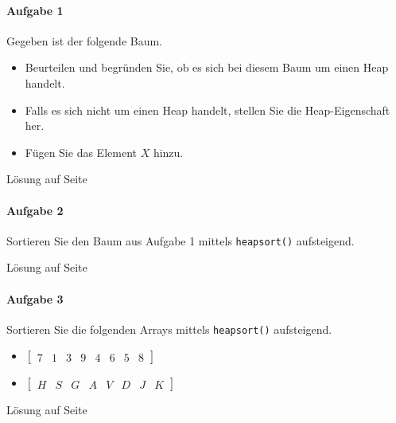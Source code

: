 \documentclass[11pt,a4paper]{scrartcl}
\begin{document}
\paragraph{Aufgabe 1} Gegeben ist der folgende Baum.
\begin{itemize}
\item Beurteilen und begründen Sie, ob es sich bei diesem Baum um einen Heap handelt.
\item Falls es sich nicht um einen Heap handelt, stellen Sie die Heap-Eigenschaft her.
\item Fügen Sie das Element $X$ hinzu.
\end{itemize}
\begin{figure}[h]
\centering
{}
\end{figure}
\begin{flushright}
Lösung auf Seite \pageref{a5.1:lsg} \\
\end{flushright}
\paragraph{Aufgabe 2} 
Sortieren Sie den Baum aus Aufgabe 1 mittels \texttt{heapsort()} aufsteigend.
\begin{flushright}
Lösung auf Seite \pageref{a5.2:lsg}
\end{flushright}
\paragraph{Aufgabe 3}
Sortieren Sie die folgenden Arrays mittels \texttt{heapsort()} aufsteigend.
\begin{itemize}
\item $\left[ \begin{array}{rrrrrrrr}
7 & 1 & 3 & 9 & 4 & 6 & 5 & 8 
\end{array} \right]$
\item $\left[ \begin{array}{rrrrrrrr}
H & S & G & A & V & D & J & K 
\end{array} \right]$
\end{itemize} 
\begin{flushright}
Lösung auf Seite \pageref{a5.3:lsg}
\end{flushright}
\end{document}
